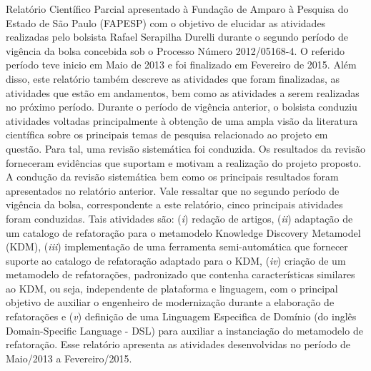 
 Relatório Científico Parcial apresentado à Fundação de Amparo à Pesquisa do Estado de São Paulo (FAPESP) com o objetivo de elucidar as atividades realizadas  
 pelo bolsista Rafael Serapilha Durelli durante o segundo período de vigência da bolsa concebida sob o Processo Número 2012/05168-4. 
 O referido período teve inicio em Maio de 2013 e foi finalizado em Fevereiro de 2015. 
 Além disso, este relatório também descreve as atividades que foram finalizadas, as atividades que estão em andamentos, bem como as atividades a serem realizadas no próximo período. 
%
Durante o período de vigência anterior, o bolsista conduziu atividades voltadas principalmente à obtenção de uma ampla visão da literatura científica sobre os principais temas de pesquisa relacionado ao projeto em questão. Para tal, uma revisão sistemática foi conduzida. Os resultados da revisão forneceram evidências que suportam e motivam a realização do projeto proposto. A condução da revisão sistemática bem como os principais resultados foram apresentados no relatório anterior.
%
Vale ressaltar que no segundo período de vigência da bolsa, correspondente a este relatório, cinco principais atividades foram conduzidas. Tais atividades são: (\textit{i}) redação de artigos, (\textit{ii}) adaptação de um catalogo de refatoração para o metamodelo Knowledge Discovery Metamodel (KDM), (\textit{iii}) implementação de uma ferramenta semi-automática que fornecer suporte ao catalogo de refatoração adaptado para o KDM, (\textit{iv}) criação de um metamodelo de refatorações, padronizado que contenha características similares ao KDM, ou seja, independente de plataforma e linguagem, com o principal objetivo de auxiliar o engenheiro de modernização durante a elaboração de refatorações e (\textit{v}) definição de uma Linguagem Especifica de Domínio (do inglês Domain-Specific Language - DSL) para auxiliar a instanciação do metamodelo de refatoração. Esse relatório apresenta as atividades desenvolvidas no período de Maio/2013 a Fevereiro/2015.
%